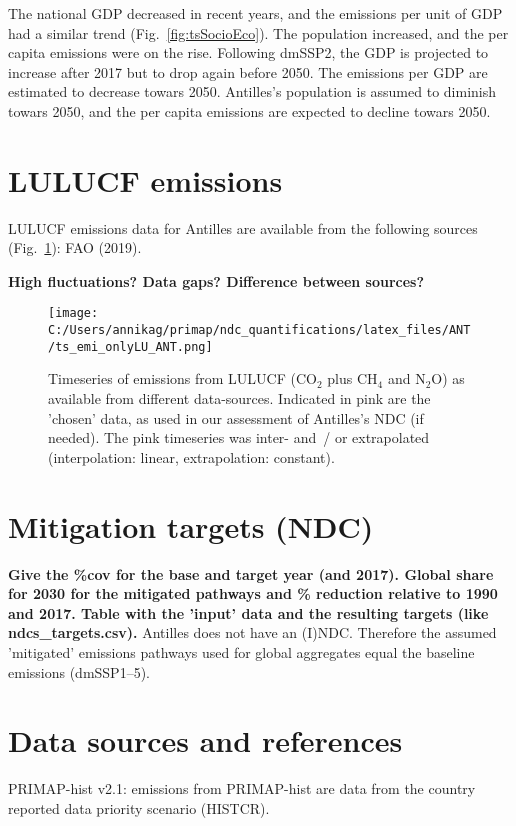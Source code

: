 \documentclass[12pt]{article}
\begin{document}
 The national GDP decreased in recent years, and the emissions per unit of GDP had a similar trend (Fig.~\ref{fig:tsSocioEco}).
 The population increased, and the per capita emissions were on the rise. 
 Following dmSSP2, the GDP is projected to increase after 2017 but to drop again before 2050. 
 The emissions per GDP are estimated to decrease towars 2050. 
 Antilles's population is assumed to diminish towars 2050, and the per capita emissions are expected to decline towars 2050. 

 \section{LULUCF emissions}
 \label{sec:emiLULUCF}
 LULUCF emissions data for Antilles are available from the following sources (Fig.~\ref{fig:tsLULUCF}): FAO (2019).

 \textbf{High fluctuations? Data gaps? Difference between sources?}
 \begin{figure}[htbp]
 \centering
 \texttt{[image: C:/Users/annikag/primap/ndc\_quantifications/latex\_files/ANT/ts\_emi\_onlyLU\_ANT.png]}
 \caption{Timeseries of emissions from LULUCF (CO$_2$ plus CH$_4$ and N$_2$O) as available from different data-sources. 
 Indicated in pink are the 'chosen' data, as used in our assessment of Antilles's NDC (if needed). 
 The pink timeseries was inter- and~/ or extrapolated (interpolation: linear, extrapolation: constant).}
 \label{fig:tsLULUCF}
 \end{figure}

 \section{Mitigation targets (NDC)}
 \label{sec:mitiTars}

 \textbf{ 
 Give the \%cov for the base and target year (and 2017).
 Global share for 2030 for the mitigated pathways and \% reduction relative to 1990 and 2017.
 Table with the 'input' data and the resulting targets (like ndcs\_targets.csv).}
 Antilles does not have an (I)NDC.
 Therefore the assumed 'mitigated' emissions pathways used for global aggregates equal the baseline emissions (dmSSP1--5).

 \section{Data sources and references}
 \label{sec:dataSourcesRefs}
 PRIMAP-hist v2.1: emissions from PRIMAP-hist are data from the country reported data priority scenario (HISTCR).

 
\end{document}
